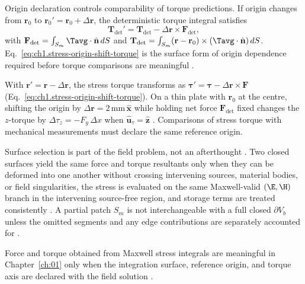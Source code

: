 Origin declaration controls comparability of torque predictions. If origin changes
from \(\mathbf{r}_0\) to \(\mathbf{r}_0'=\mathbf{r}_0+\Delta\mathbf{r}\), the
deterministic torque integral satisfies
\begin{equation}
\label{eq:ch1.stress-origin-shift-torque}
\mathbf{T}_{\mathrm{det}}'
=
\mathbf{T}_{\mathrm{det}}-\Delta\mathbf{r}\times\mathbf{F}_{\mathrm{det}},
\end{equation}
with
\(\mathbf{F}_{\mathrm{det}}=\int_{S_m}\Tavg\cdot\hat{\mathbf{n}}\,dS\) and
\(\mathbf{T}_{\mathrm{det}}=\int_{S_m}(\mathbf{r}-\mathbf{r}_0)\times(\Tavg\cdot\hat{\mathbf{n}})\,dS\).
Eq.~\eqref{eq:ch1.stress-origin-shift-torque} is the surface form of
origin dependence required before torque comparisons are meaningful \cite{stratton1941}.

\begin{example}
\label{ex:ch1.origin-shift}
With $\mathbf{r}'=\mathbf{r}-\Delta\mathbf{r}$, the stress torque transforms as $\boldsymbol{\tau}'=\boldsymbol{\tau}-\Delta\mathbf{r}\times\mathbf{F}$ (Eq.~\eqref{eq:ch1.stress-origin-shift-torque}). On a thin plate with $\mathbf{r}_0$ at the centre, shifting the origin by $\Delta\mathbf{r}=2\,\mathrm{mm}\,\hat{\mathbf{x}}$ while holding net force $\mathbf{F}_{\mathrm{det}}$ fixed changes the $z$-torque by $\Delta\tau_z=-F_y\,\Delta x$ when $\hat{\mathbf{u}}_\tau=\hat{\mathbf{z}}$ \cite{stratton1941}. Comparisons of stress torque with mechanical measurements must declare the same reference origin.
\end{example}

Surface selection is part of the field problem, not an afterthought \cite{stratton1941}. Two closed surfaces yield the same force and torque resultants only when they can be deformed into one another without crossing intervening sources, material bodies, or field singularities, the stress is evaluated on the same Maxwell-valid $(\E,\H)$ branch in the intervening source-free region, and storage terms are treated consistently \cite{maxwell1873,stratton1941}. A partial patch $S_m$ is not interchangeable with a full closed $\partial V_b$ unless the omitted segments and any edge contributions are separately accounted for \cite{stratton1941}.

\label{prop:ch1.stress-torque-admissibility}
Force and torque obtained from Maxwell stress integrals are meaningful in Chapter~\ref{ch:01} only when the integration surface, reference origin, and torque axis are declared with the field solution \cite{stratton1941,beth1936}.


